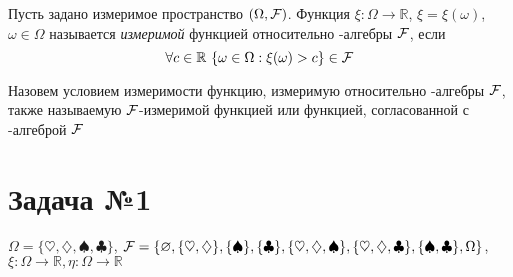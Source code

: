 \documentclass[a4paper, 10pt]{article}
\begin{document}
 Пусть задано измеримое пространство $(\Omega,\mathcal{F})$. Функция $\xi:\Omega\longrightarrow\mathbb{R}$, $\xi=\xi(\omega)$, $\omega\in\Omega$ называется \textit{измеримой} функцией относительно \s-алгебры $\mathcal{F}$, если $$\forall c\in\mathbb{R}\ \{\omega\in\Omega:\xi(\omega)>c\}\in\fk$$

Назовем условием измеримости функцию, измеримую относительно \s-алгебры $\mathcal{F}$, также называемую $\mathcal{F}$-измеримой функцией или функцией, согласованной с \s-алгеброй $\mathcal{F}$
    



\section*{Задача №1}
$\Omega=\{\heartsuit, \diamondsuit,\spadesuit,\clubsuit\}$, $\mathcal{F}=\{\varnothing, \{\heartsuit,\diamondsuit\}, \{\spadesuit\}, \{\clubsuit\}, \{\heartsuit,\diamondsuit,\spadesuit\}, \{\heartsuit,\diamondsuit,\clubsuit\}, \{\spadesuit, \clubsuit\}, \Omega\}$, $\xi:\Omega\rightarrow\mathbb{R}, \eta:\Omega\rightarrow\mathbb{R}$
\end{document}
